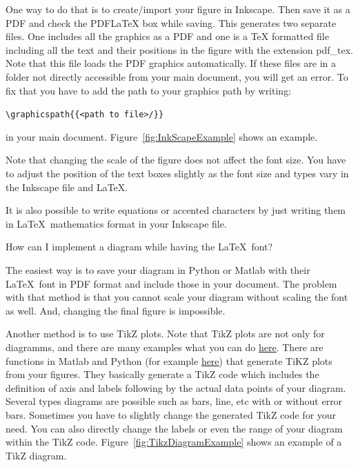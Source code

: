 \begin{QandA}
	\begin{answered}
		One way to do that is to create/import your figure in Inkscape. Then save it as a PDF and check the PDFLaTeX box while saving. This generates two separate files. One includes all the graphics as a PDF and one is a TeX formatted file including all the text and their positions in the figure with the extension pdf\_tex. Note that this file loads the PDF graphics automatically. If these files are in a folder not directly accessible from your main document, you will get an error. To fix that you have to add the path to your graphics path by writing:
		
		\verb|\graphicspath{{<path to file>/}}| 
		
		in your main document. Figure~\ref{fig:InkScapeExample} shows an example.
		
%	
%    	
%
	
		Note that changing the scale of the figure does not affect the font size. You have to adjust the position of the text boxes slightly as the font size and types vary in the Inkscape file and \LaTeX.
		
		It is also possible to write equations or accented characters by just writing them in \LaTeX \, mathematics format in your Inkscape file.	
	
	\end{answered}	


\item How can I implement a diagram while having the \LaTeX\ font?

	\begin{answered}
		The easiest way is to save your diagram in Python or Matlab with their \LaTeX\ font in PDF format and include those in your document. The problem with that method is that you cannot scale your diagram without scaling the font as well. And, changing the final figure is impossible.
		
		Another method is to use TikZ plots. Note that TikZ plots are not only for diagramms, and there are many examples what you can do \href{http://www.texample.net/tikz/}{here}. There are functions in Matlab and Python (for example \href{https://github.com/matlab2tikz/matlab2tikz}{here}) that generate TiKZ plots from your figures. They basically generate a TikZ code which includes the definition of axis and labels following by the actual data points of your diagram. Several types diagrams are possible such as bars, line, etc with or without error bars. Sometimes you have to slightly change the generated TikZ code for your need. You can also directly change the labels or even the range of your diagram within the TikZ code. Figure~\ref{fig:TikzDiagramExample} shows an example of a TikZ diagram.
		

\end{answered}
\end{QandA}
